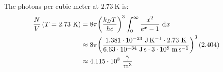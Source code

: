 \documentclass{article}
\begin{document}
The photons per cubic meter at $2.73~\unit{\kelvin}$ is:
\begin{equation}
    \begin{split}
        \frac{N}{V}\left(T = 2.73~\unit{\kelvin}\right) & = 8\pi {\left(\frac{k_BT}{hc}\right)}^3\int_0^{\infty} \frac{x^2}{e^x - 1} \, \diff{x} \\
        & \approx 8\pi {\left(\frac{1.381 \cdot 10^{-23}~\unit{\joule\per\kelvin} \cdot 2.73~\unit{\kelvin}}{6.63 \cdot 10^{-34}~\unit{\joule\second} \cdot 3 \cdot 10^8~\unit{\meter\per\second}}\right)}^3\left(2.404\right) \\
        & \approx 4.115 \cdot 10^{8}~\unit{\frac{\gamma}{\meter\cubed}}  \\
    \end{split}
\end{equation}

\clearpage
\end{document}
